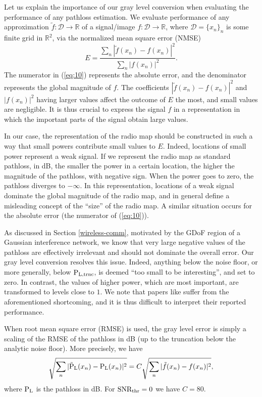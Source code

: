 \documentclass[10pt,a4paper]{article}
\begin{document}
Let us explain the importance of our gray level conversion when evaluating the performance of any pathloss estimation.
We evaluate performance of any approximation $\tilde{f}:\mathcal{D}\rightarrow\mathbb{R}$ of a signal/image $f:\mathcal{D}\rightarrow\mathbb{R}$, where $\mathcal{D} = \{x_n\}_n$ is some finite grid in $\mathbb{R}^2$, via the normalized mean square error (NMSE)
\begin{equation}
    E= \frac{\sum_n |\tilde{f}(x_n)-f(x_n)|^2}{\sum_n |f(x_n)|^2}.
    \label{eq:10}
\end{equation}
The numerator in (\ref{eq:10}) represents the absolute error, and the denominator represents the global magnitude of $f$.
The coefficients $|\tilde{f}(x_n)-f(x_n)|^2$ and $|f(x_n)|^2$ having larger values affect the outcome of $E$ the most, and small values are negligible. It is thus crucial to express the signal $f$ in a representation in which the important parts of the signal obtain large values.

In our case, the representation of the radio map should be constructed in such a way that small powers contribute small values to $E$. Indeed, locations of small power represent a weak signal.
If we represent the radio map as standard pathloss, in dB, the smaller the power in a certain location, the higher the magnitude of the pathloss, with negative sign. When the power goes to zero, the pathloss diverges to $-\infty$. In this representation, locations of a weak signal dominate the global magnitude of the radio map, and in general define a misleading concept of the ``size'' of the radio map. A similar situation occurs for the absolute error (the numerator of (\ref{eq:10})). 

As discussed in Section \ref{wireless-comm}, motivated by the GDoF region of a Gaussian interference network,
we know that very large negative values of the pathloss are effectively irrelevant and should not dominate the 
overall error.  Our gray level conversion resolves this issue. Indeed, anything below the noise floor, or more generally, below $\textup{P}_{\textup{L,trnc}}$, is deemed ``too small to be interesting'', and set to zero. 
In contrast, the values of higher power, which are most important, are transformed to levels close to $1$. 
We note that papers like \cite{TensorCompletion,MatComp,LowRankOutliers} suffer from the aforementioned shortcoming, and it is thus difficult to interpret their reported performance. 

When root mean square error (RMSE) is used, the gray level error is simply a scaling of the RMSE of the pathloss in dB (up to the truncation below the analytic noise floor). More precisely, we have
\[\sqrt{\sum_n |\tilde{\textup{P}}_{\textup{L}}(x_n)-\textup{P}_{\textup{L}}(x_n)|^2}=C\sqrt{\sum_n |\tilde{f}(x_n)-f(x_n)|^2},\]
where $\textup{P}_{\textup{L}}$ is the pathloss in dB. For $\textup{SNR}_{\textup{thr}}=0$ we have $C=80$.
\end{document}

